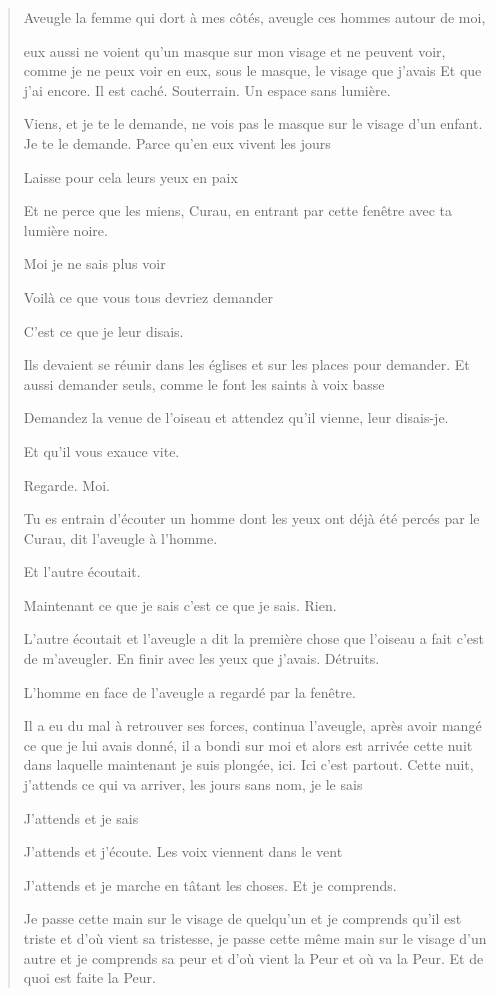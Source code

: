 \begin{quote}
Aveugle la femme qui dort à mes côtés, aveugle ces hommes autour de moi,

eux aussi ne voient qu'un masque sur mon visage et ne peuvent voir,
comme je ne peux voir en eux, sous le masque, le visage que j'avais Et
que j'ai encore. Il est caché. Souterrain. Un espace sans lumière.

Viens, et je te le demande, ne vois pas le masque sur le visage d'un
enfant. Je te le demande. Parce qu'en eux vivent les jours

Laisse pour cela leurs yeux en paix

Et ne perce que les miens, Curau, en entrant par cette fenêtre avec ta
lumière noire.

Moi je ne sais plus voir

Voilà ce que vous tous devriez demander

C'est ce que je leur disais.

Ils devaient se réunir dans les églises et sur les places pour demander.
Et aussi demander seuls, comme le font les saints à voix basse

Demandez la venue de l'oiseau et attendez qu'il vienne, leur disais-je.

Et qu'il vous exauce vite.

Regarde. Moi.

Tu es entrain d'écouter un homme dont les yeux ont déjà été percés par
le Curau, dit l'aveugle à l'homme.

Et l'autre écoutait.

Maintenant ce que je sais c'est ce que je sais. Rien.

L'autre écoutait et l'aveugle a dit la première chose que l'oiseau a
fait c'est de m'aveugler. En finir avec les yeux que j'avais. Détruits.

L'homme en face de l'aveugle a regardé par la fenêtre.

Il a eu du mal à retrouver ses forces, continua l'aveugle, après avoir
mangé ce que je lui avais donné, il a bondi sur moi et alors est arrivée
cette nuit dans laquelle maintenant je suis plongée, ici. Ici c'est
partout. Cette nuit, j'attends ce qui va arriver, les jours sans nom, je
le sais

J'attends et je sais

J'attends et j'écoute. Les voix viennent dans le vent

J'attends et je marche en tâtant les choses. Et je comprends.

Je passe cette main sur le visage de quelqu'un et je comprends qu'il est
triste et d'où vient sa tristesse, je passe cette même main sur le
visage d'un autre et je comprends sa peur et d'où vient la Peur et où va
la Peur. Et de quoi est faite la Peur.


\end{quote}

